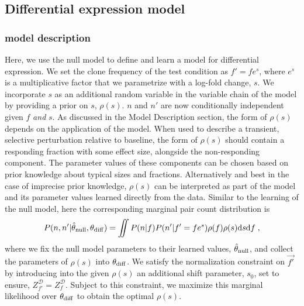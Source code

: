 \documentclass[letterpaper,english,prl,reprint,longbibliography]{revtex4-1} %
\begin{document}
\subsection*{Differential expression model}

\subsubsection*{model description}
Here, we use the null model to define and learn a model for differential expression. 
We set the clone frequency of the test condition as $f'=fe^s$, where $e^s$ is a multiplicative factor that we parametrize with a log-fold change, $s$. 
We incorporate $s$ as an additional random variable in the variable chain of the model by providing a prior on $s$, $\rho(s)$. 
$n$ and $n'$ are now conditionally independent given $f$ \textit{and} $s$.
As discussed in the Model Description section, the form of $\rho(s)$ depends on the application of the model. 
When used to describe a transient, selective perturbation relative to baseline, the form of $\rho(s)$ should contain a responding fraction with some effect size, alongside the non-responding component. 
The parameter values of these components can be chosen based on prior knowledge about typical sizes and fractions. 
Alternatively and best in the case of imprecise prior knowledge, $\rho(s)$ can be interpreted as part of the model and its parameter values learned directly from the data. 
Similar to the learning of the null model, here the corresponding marginal pair count distribution is 
\begin{equation}
    \begin{split}
	P(n,n'|\hat{\theta}_{\textrm{\textrm{null}}},\theta_{\textrm{\textrm{diff}}})=\iint P(n|f)P(n'|f'=fe^s)\rho(f)\rho(s)\text{d}s\text{d}f\;,
	\end{split}
\end{equation}
where we fix the null model parameters to their learned values, $\hat{\theta}_{\textrm{\textrm{null}}}$, and collect the parameters of $\rho(s)$ into $\theta_{\textrm{\textrm{diff}}}$. 
We satisfy the normalization constraint on $\vec{f'}$ by introducing into the given $\rho(s)$ an additional shift parameter, $s_0$, set to ensure, $Z^\mathcal{D}_{f'}=Z^\mathcal{D}_f$.
Subject to this constraint, we maximize this marginal likelihood over $\theta_{\textrm{\textrm{diff}}}$ to obtain the optimal $\rho(s)$. 
\end{document}
